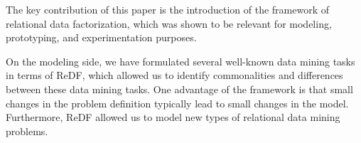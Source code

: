 The key contribution of this paper is the introduction of the framework of relational data factorization,  
which was shown to be relevant for modeling, prototyping, and experimentation purposes. 

On the modeling side, we have formulated several well-known data mining tasks in terms of ReDF, 
which allowed us to identify commonalities and differences between these data mining tasks. 
One advantage of the framework is that small changes in the problem definition typically lead to small changes in the model. Furthermore, ReDF allowed us to model new types of relational data mining problems.

 





